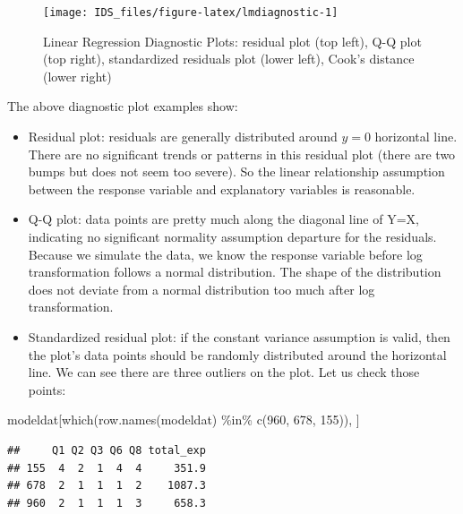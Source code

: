 \documentclass[
  12pt,
]{krantz}
\makeatletter
\newenvironment{Shaded}{\begin{snugshade}}{\end{snugshade}}
\newcommand{\DecValTok}[1]{\textcolor[rgb]{0.06,0.06,0.06}{#1}}
\newcommand{\FunctionTok}[1]{\textcolor[rgb]{0,0,0}{#1}}
\newcommand{\NormalTok}[1]{#1}
\newcommand{\SpecialCharTok}[1]{\textcolor[rgb]{0,0,0}{#1}}
\newenvironment{kframe}{%
\medskip{}
\setlength{\fboxsep}{.8em}
 \def\at@end@of@kframe{}%
 \ifinner\ifhmode%
  \def\at@end@of@kframe{\end{minipage}}%
  \begin{minipage}{\columnwidth}%
 \fi\fi%
 \def\FrameCommand##1{\hskip\@totalleftmargin \hskip-\fboxsep
 \colorbox{shadecolor}{##1}\hskip-\fboxsep
     \hskip-\linewidth \hskip-\@totalleftmargin \hskip\columnwidth}%
 \MakeFramed {\advance\hsize-\width
   \@totalleftmargin\z@ \linewidth\hsize
   \@setminipage}}%
 {\par\unskip\endMakeFramed%
 \at@end@of@kframe}
\renewenvironment{Shaded}{\begin{kframe}}{\end{kframe}}
\makeatother
\begin{document}
\begin{figure}

{\centering \texttt{[image: IDS\_files/figure-latex/lmdiagnostic-1]} 

}

\caption{Linear Regression Diagnostic Plots: residual plot (top left), Q-Q plot (top right), standardized residuals plot (lower left), Cook's distance (lower right)}\label{fig:lmdiagnostic}
\end{figure}

The above diagnostic plot examples show:

\begin{itemize}
\item
  Residual plot: residuals are generally distributed around \(y=0\) horizontal line. There are no significant trends or patterns in this residual plot (there are two bumps but does not seem too severe). So the linear relationship assumption between the response variable and explanatory variables is reasonable.
\item
  Q-Q plot: data points are pretty much along the diagonal line of Y=X, indicating no significant normality assumption departure for the residuals. Because we simulate the data, we know the response variable before log transformation follows a normal distribution. The shape of the distribution does not deviate from a normal distribution too much after log transformation.
\item
  Standardized residual plot: if the constant variance assumption is valid, then the plot's data points should be randomly distributed around the horizontal line. We can see there are three outliers on the plot. Let us check those points:
\end{itemize}

\begin{Shaded}
\begin{Highlighting}[]
\NormalTok{modeldat[}\FunctionTok{which}\NormalTok{(}\FunctionTok{row.names}\NormalTok{(modeldat) }\SpecialCharTok{\%in\%} \FunctionTok{c}\NormalTok{(}\DecValTok{960}\NormalTok{, }\DecValTok{678}\NormalTok{, }\DecValTok{155}\NormalTok{)), ]}
\end{Highlighting}
\end{Shaded}

\begin{verbatim}
##     Q1 Q2 Q3 Q6 Q8 total_exp
## 155  4  2  1  4  4     351.9
## 678  2  1  1  1  2    1087.3
## 960  2  1  1  1  3     658.3
\end{verbatim}
\end{document}

